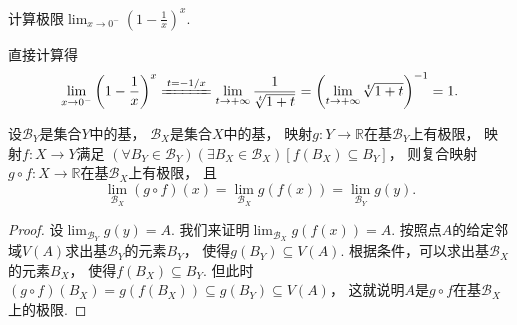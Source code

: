\begin{example}
计算极限\(\lim_{x\to0^-} \left(1-\frac1x\right)^x\).
\begin{solution}
直接计算得\[
	\lim_{x\to0^-} \left(1-\frac1x\right)^x
	\xlongequal{t=-1/x} \lim_{t\to+\infty} \frac{1}{\sqrt[t]{1+t}}
	= \left(\lim_{t\to+\infty} \sqrt[t]{1+t}\right)^{-1}
	= 1.
\]
\end{solution}
\end{example}

\begin{theorem}
设\(\mathcal{B}_Y\)是集合\(Y\)中的基，
\(\mathcal{B}_X\)是集合\(X\)中的基，
映射\(g\colon Y\to\mathbb{R}\)在基\(\mathcal{B}_Y\)上有极限，
映射\(f\colon X\to Y\)满足
\((\forall B_Y\in\mathcal{B}_Y)
(\exists B_X\in\mathcal{B}_X)
[f(B_X) \subseteq B_Y]\)，
则复合映射\(g \circ f\colon X\to\mathbb{R}\)在基\(\mathcal{B}_X\)上有极限，
且\[
	\lim_{\mathcal{B}_X} (g \circ f)(x)
	= \lim_{\mathcal{B}_X} g(f(x))
	= \lim_{\mathcal{B}_Y} g(y).
\]
\begin{proof}
设\(\lim_{\mathcal{B}_Y} g(y) = A\).
我们来证明\(\lim_{\mathcal{B}_X} g(f(x)) = A\).
按照点\(A\)的给定邻域\(V(A)\)求出基\(\mathcal{B}_Y\)的元素\(B_Y\)，
使得\(g(B_Y) \subseteq V(A)\).
根据条件，可以求出基\(\mathcal{B}_X\)的元素\(B_X\)，
使得\(f(B_X) \subseteq B_Y\).
但此时\((g \circ f)(B_X) = g(f(B_X)) \subseteq g(B_Y) \subseteq V(A)\)，
这就说明\(A\)是\(g \circ f\)在基\(\mathcal{B}_X\)上的极限.
\end{proof}
\end{theorem}

